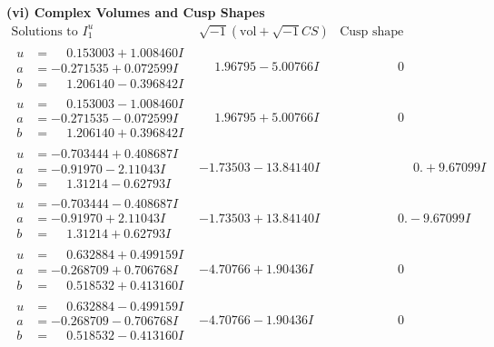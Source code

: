 \documentclass[1p]{elsarticle_modified}
\theoremstyle{definition}
\newcommand{\I}{\sqrt{-1}}
\begin{document}
\newpage\flushleft \textbf{(vi) Complex Volumes and Cusp Shapes}
$$\begin{array}{c|c|c}  
\text{Solutions to }I^u_{1}& \I (\text{vol} + \sqrt{-1}CS) & \text{Cusp shape}\\
 \hline 
\begin{aligned}
u &= \phantom{-}0.153003 + 1.008460 I \\
a &= -0.271535 + 0.072599 I \\
b &= \phantom{-}1.206140 - 0.396842 I\end{aligned}
 & \phantom{-}1.96795 - 5.00766 I & \phantom{-0.000000 } 0 \\ \hline\begin{aligned}
u &= \phantom{-}0.153003 - 1.008460 I \\
a &= -0.271535 - 0.072599 I \\
b &= \phantom{-}1.206140 + 0.396842 I\end{aligned}
 & \phantom{-}1.96795 + 5.00766 I & \phantom{-0.000000 } 0 \\ \hline\begin{aligned}
u &= -0.703444 + 0.408687 I \\
a &= -0.91970 - 2.11043 I \\
b &= \phantom{-}1.31214 - 0.62793 I\end{aligned}
 & -1.73503 - 13.84140 I & \phantom{-0.000000 -}0. + 9.67099 I \\ \hline\begin{aligned}
u &= -0.703444 - 0.408687 I \\
a &= -0.91970 + 2.11043 I \\
b &= \phantom{-}1.31214 + 0.62793 I\end{aligned}
 & -1.73503 + 13.84140 I & \phantom{-0.000000 } 0. - 9.67099 I \\ \hline\begin{aligned}
u &= \phantom{-}0.632884 + 0.499159 I \\
a &= -0.268709 + 0.706768 I \\
b &= \phantom{-}0.518532 + 0.413160 I\end{aligned}
 & -4.70766 + 1.90436 I & \phantom{-0.000000 } 0 \\ \hline\begin{aligned}
u &= \phantom{-}0.632884 - 0.499159 I \\
a &= -0.268709 - 0.706768 I \\
b &= \phantom{-}0.518532 - 0.413160 I\end{aligned}
 & -4.70766 - 1.90436 I & \phantom{-0.000000 } 0 \\ \hline\begin{aligned}

\end{aligned}
\end{array}$$
\end{document}
